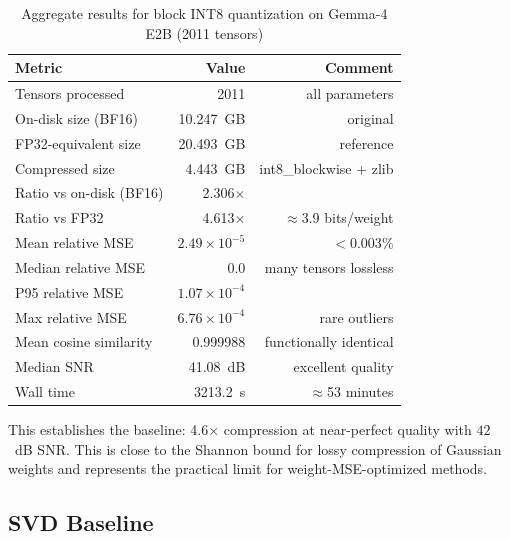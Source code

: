 \documentclass[11pt,a4paper]{article}
\begin{document}
\begin{table}[H]
	\centering
	\caption{Aggregate results for block INT8 quantization on Gemma-4 E2B (2011 tensors)}
	\label{tab:int8_baseline}
	\begin{tabular}{@{}lrr@{}}
		\toprule
		Metric                  & Value                 & Comment                  \\
		\midrule
		Tensors processed       & 2011                  & all parameters           \\
		On-disk size (BF16)     & 10.247~GB             & original                 \\
		FP32-equivalent size    & 20.493~GB             & reference                \\
		Compressed size         & 4.443~GB              & int8\_blockwise + zlib   \\
		Ratio vs on-disk (BF16) & 2.306$\times$         &                          \\
		Ratio vs FP32           & 4.613$\times$         & $\approx$3.9 bits/weight \\
		Mean relative MSE       & $2.49 \times 10^{-5}$ & $< 0.003\%$              \\
		Median relative MSE     & 0.0                   & many tensors lossless    \\
		P95 relative MSE        & $1.07 \times 10^{-4}$ &                          \\
		Max relative MSE        & $6.76 \times 10^{-4}$ & rare outliers            \\
		Mean cosine similarity  & 0.999988              & functionally identical   \\
		Median SNR              & 41.08~dB              & excellent quality        \\
		Wall time               & 3213.2~s              & $\approx$53 minutes      \\
		\bottomrule
	\end{tabular}
\end{table}

This establishes the baseline: 4.6$\times$ compression at near-perfect quality with
$42$~dB SNR. This is close to the Shannon bound for lossy compression of Gaussian
weights and represents the practical limit for weight-MSE-optimized methods.

\subsection{SVD Baseline}
\end{document}
